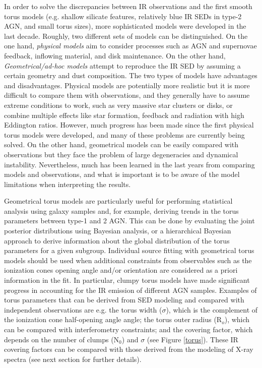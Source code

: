 \documentclass{natureprintstyle}
\begin{document}
In order to solve the discrepancies between IR observations and the first smooth torus models (e.g. shallow silicate features, relatively {blue} IR SEDs in type-2 AGN, and small torus sizes), 
more sophisticated models were developed in the last decade. Roughly, two different sets of models can be distinguished. On the one hand, {\it physical models} aim to consider processes such as AGN and supernovae feedback, inflowing material, and disk maintenance\cite{Schartmann08,Wada02,Wada12}. On the other hand, {\it Geometrical/ad-hoc models} attempt to reproduce the IR SED by assuming a certain geometry and dust composition\cite{Nenkova08a,Nenkova08b,Honig10,Stalevski12,Siebenmorgen15}. The two types of models have advantages and disadvantages. Physical models are {potentially more realistic but it is more difficult to compare them with observations, and they generally have to assume extreme conditions to work, such as very massive star clusters or disks, or combine multiple effects like star formation, feedback and radiation with high Eddington ratios. However, much progress has been made since the first physical torus models were developed, and many of these problems are currently being solved.} On the other hand, geometrical models can be easily compared with observations but they face the problem of large degeneracies and dynamical instability. Nevertheless, much has been learned in the last years from comparing models and observations, and what is important is to be aware of the model limitations when interpreting the results\cite{Feltre12}. 


Geometrical torus models are particularly useful for performing statistical analysis {using galaxy samples and, for example, deriving trends in the torus parameters between 
type-1 and 2 AGN. This can be done by evaluating the joint posterior distributions using Bayesian analysis\cite{Ramos11}, or a hierarchical Bayesian approach 
to derive information about the global distribution of the torus parameters for a given subgroup\cite{Ichikawa15}. Individual source fitting with geometrical 
torus models should be used when additional constraints from observables such as the ionization cones opening angle and/or orientation are considered as a priori information in the fit.} In particular, clumpy torus models have made significant progress in accounting for the IR emission of different AGN samples\cite{Mor09,Ramos09,Honig10,Alonso11,Lira13}. Examples of torus parameters that can be derived from SED modeling and compared with independent observations are e.g. the torus width ($\sigma$), which is the complement of the ionization cone half-opening angle angle; the torus outer radius (R$_o$), which can be compared with interferometry constraints; and the covering factor, which depends on the number of clumps (N$_0$) and $\sigma$ (see Figure \ref{torus}). These IR covering factors can be compared with those derived from the modeling of X-ray spectra (see next section for further details). 
\end{document}

